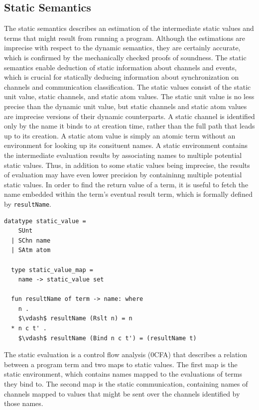 \documentclass[letterpaper, 11pt]{report}
\begin{document}
\subsection{Static Semantics}

The static semantics describes an estimation of the intermediate static values and terms
that might result from running a program. Although the estimations are imprecise with
respect to the dynamic semantics, they are certainly accurate,
which is confirmed by the mechanically checked proofs of soundness.
The static semantics enable deduction of static information about channels and events, which is
crucial for statically deducing information about synchronization on channels and
communication classification.
The static values consist of the static unit value, static channels, and static atom
values. The static unit value is no less precise than the dynamic unit value, but
static channels and static atom values are imprecise versions of their dynamic
counterparts. A static channel is identified only by the name it binds to at creation time,
rather than the full path that leads up to its creation. A static atom value is simply an
atomic term without an environment for looking up its consituent names. A static
environment contains the intermediate evaluation results by
associating names to multiple potential static values.
Thus, in addition to some static values being imprecise,
the results of evaluation may have even lower precision
by containinng multiple potential static values. 
In order to find the return value of a term, it is useful to fetch the name
embedded within the term's eventual result term, which is formally defined by \lstinline{resultName}.

\begin{lstlisting}[language=logic, mathescape]
  datatype static_value =
    SUnt
  | SChn name
  | SAtm atom 

  type static_value_map =
    name -> static_value set

  fun resultName of term -> name: where
    n .
    $\vdash$ resultName (Rslt n) = n
  * n c t' . 
    $\vdash$ resultName (Bind n c t') = (resultName t)
\end{lstlisting}

The static evaluation is a control flow analysis (0CFA)
that describes a relation between a program term and two maps to static values.
The first map is the static environment, which contains names mapped to the 
evaluations of terms they bind to.
The second map is the static communication, containing names of channels mapped to
values that might be sent over the channels identified by those names.
\end{document}
